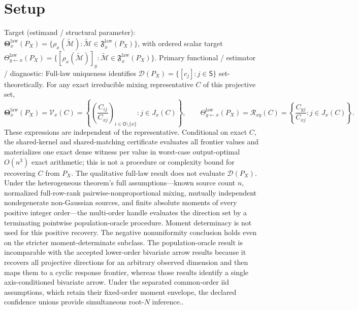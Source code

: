 \documentclass{article}
\begin{document}
\section{Setup}

Target (estimand / structural parameter): \(\boldsymbol\Theta_x^{\mathrm{law}}(P_X)=\{\rho_x(\widetilde{\mathcal M}):\widetilde{\mathcal M}\in\mathfrak F_x^{\mathrm{law}}(P_X)\}\), with ordered scalar target \(\Theta_{y\leftarrow x}^{\mathrm{law}}(P_X)=\{[\rho_x(\widetilde{\mathcal M})]_y:\widetilde{\mathcal M}\in\mathfrak F_x^{\mathrm{law}}(P_X)\}\).
Primary functional / estimator / diagnostic: Full-law uniqueness identifies \(\mathcal D(P_X)=\{[c_j]:j\in\mathsf S\}\) set-theoretically. For any exact irreducible mixing representative \(C\) of this projective set,
\[
 \boldsymbol\Theta_x^{\mathrm{law}}(P_X)
 =\mathcal V_x(C)
 =\left\{\left(\frac{C_{ij}}{C_{xj}}\right)_{i\in\mathsf O\setminus\{x\}}:j\in J_x(C)\right\},
 \qquad
 \Theta_{y\leftarrow x}^{\mathrm{law}}(P_X)
 =\mathcal R_{xy}(C)
 =\left\{\frac{C_{yj}}{C_{xj}}:j\in J_x(C)\right\}.
\]
These expressions are independent of the representative. Conditional on exact \(C\), the shared-kernel and shared-matching certificate evaluates all frontier values and materializes one exact dense witness per value in worst-case output-optimal \(O(n^3)\) exact arithmetic; this is not a procedure or complexity bound for recovering \(C\) from \(P_X\). The qualitative full-law result does not evaluate \(\mathcal D(P_X)\). Under the heterogeneous theorem's full assumptions---known source count \(n\), normalized full-row-rank pairwise-nonproportional mixing, mutually independent nondegenerate non-Gaussian sources, and finite absolute moments of every positive integer order---the multi-order handle evaluates the direction set by a terminating pointwise population-oracle procedure. Moment determinacy is not used for this positive recovery. The negative nonuniformity conclusion holds even on the stricter moment-determinate subclass. The population-oracle result is incomparable with the accepted lower-order bivariate arrow results because it recovers all projective directions for an arbitrary observed dimension and then maps them to a cyclic response frontier, whereas those results identify a single axis-conditioned bivariate arrow. Under the separated common-order iid assumptions, which retain their fixed-order moment envelope, the declared confidence unions provide simultaneous root-\(N\) inference..
\end{document}
